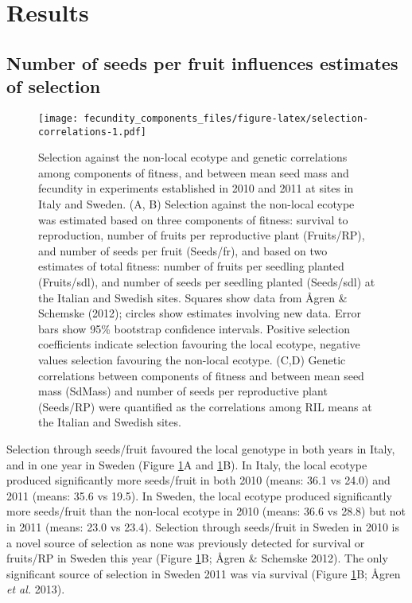 \documentclass[]{article}
\begin{document}
\hypertarget{results}{%
\section{Results}\label{results}}

\hypertarget{number-of-seeds-per-fruit-influences-estimates-of-selection}{%
\subsection{Number of seeds per fruit influences estimates of selection}\label{number-of-seeds-per-fruit-influences-estimates-of-selection}}

\begin{figure}
\centering
\texttt{[image: fecundity\_components\_files/figure-latex/selection-correlations-1.pdf]}
\caption{\label{fig:selection-correlations}Selection against the non-local ecotype and genetic correlations among components of fitness, and between mean seed mass and fecundity in experiments established in 2010 and 2011 at sites in Italy and Sweden. (A, B) Selection against the non-local ecotype was estimated based on three components of fitness: survival to reproduction, number of fruits per reproductive plant (Fruits/RP), and number of seeds per fruit (Seeds/fr), and based on two estimates of total fitness: number of fruits per seedling planted (Fruits/sdl), and number of seeds per seedling planted (Seeds/sdl) at the Italian and Swedish sites. Squares show data from Ågren \& Schemske (2012); circles show estimates involving new data. Error bars show 95\% bootstrap confidence intervals. Positive selection coefficients indicate selection favouring the local ecotype, negative values selection favouring the non-local ecotype. (C,D) Genetic correlations between components of fitness and between mean seed mass (SdMass) and number of seeds per reproductive plant (Seeds/RP) were quantified as the correlations among RIL means at the Italian and Swedish sites.}
\end{figure}

Selection through seeds/fruit favoured the local genotype in both years in Italy, and in one year in Sweden (Figure \ref{fig:selection-correlations}A and \ref{fig:selection-correlations}B).
In Italy, the local ecotype produced significantly more seeds/fruit in both 2010
(means:
36.1
vs
24.0)
and 2011 (means:
35.6
vs
19.5).
In Sweden, the local ecotype produced significantly more seeds/fruit than the non-local ecotype in 2010 (means:
36.6
vs
28.8)
but not in 2011 (means:
23.0
vs
23.4).
Selection through seeds/fruit in Sweden in 2010 is a novel source of selection as none was previously detected for survival or fruits/RP in Sweden this year (Figure \ref{fig:selection-correlations}B; Ågren \& Schemske 2012). The only significant source of selection in Sweden 2011 was via survival (Figure \ref{fig:selection-correlations}B; Ågren \emph{et al.} 2013).
\end{document}
